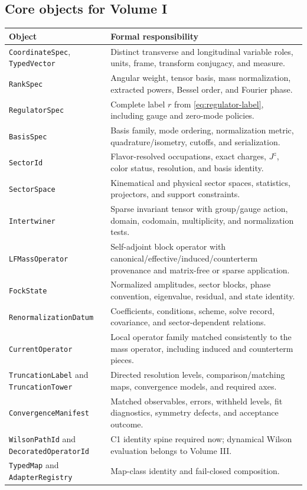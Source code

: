 \documentclass[11pt]{article}
\begin{document}
\subsection{Core objects for Volume I}

\begin{longtable}{L{0.25\textwidth}L{0.65\textwidth}}
\toprule
Object & Formal responsibility\\
\midrule
\endhead
\texttt{CoordinateSpec}, \texttt{TypedVector} & Distinct transverse and longitudinal variable roles, units, frame, transform conjugacy, and measure.\\
\texttt{RankSpec} & Angular weight, tensor basis, mass normalization, extracted powers, Bessel order, and Fourier phase.\\
\texttt{RegulatorSpec} & Complete label \(r\) from \cref{eq:regulator-label}, including gauge and zero-mode policies.\\
\texttt{BasisSpec} & Basis family, mode ordering, normalization metric, quadrature/isometry, cutoffs, and serialization.\\
\texttt{SectorId} & Flavor-resolved occupations, exact charges, \(J^z\), color status, resolution, and basis identity.\\
\texttt{SectorSpace} & Kinematical and physical sector spaces, statistics, projectors, and support constraints.\\
\texttt{Intertwiner} & Sparse invariant tensor with group/gauge action, domain, codomain, multiplicity, and normalization tests.\\
\texttt{LFMassOperator} & Self-adjoint block operator with canonical/effective/induced/counterterm provenance and matrix-free or sparse application.\\
\texttt{FockState} & Normalized amplitudes, sector blocks, phase convention, eigenvalue, residual, and state identity.\\
\texttt{RenormalizationDatum} & Coefficients, conditions, scheme, solve record, covariance, and sector-dependent relations.\\
\texttt{CurrentOperator} & Local operator family matched consistently to the mass operator, including induced and counterterm pieces.\\
\texttt{TruncationLabel} and \texttt{TruncationTower} & Directed resolution levels, comparison/matching maps, convergence models, and required axes.\\
\texttt{ConvergenceManifest} & Matched observables, errors, withheld levels, fit diagnostics, symmetry defects, and acceptance outcome.\\
\texttt{WilsonPathId} and \texttt{DecoratedOperatorId} & C1 identity spine required now; dynamical Wilson evaluation belongs to Volume III.\\
\texttt{TypedMap} and \texttt{AdapterRegistry} & Map-class identity and fail-closed composition.\\
\bottomrule
\end{longtable}
\end{document}
